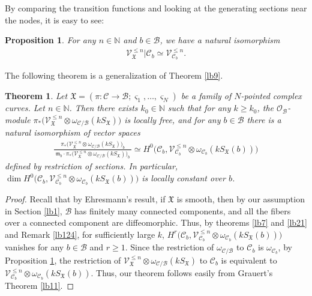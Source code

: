 \documentclass[12pt,a4paper,notitlepage]{report}
\theoremstyle{definition}
\theoremstyle{plain}
\newtheorem{thm}[df]{Theorem}
\newtheorem{pp}[df]{Proposition}
\newcommand{\fk}{\mathfrak}
\newcommand{\mc}{\mathcal}
\newcommand{\scr}{\mathscr}
\newcommand{\sgm}{\varsigma}
\newcommand{\SX}{S_{\fk X}}
\newcommand{\mbb}{\mathbb}
\newcommand{\Nbb}{\mathbb N}
\numberwithin{equation}{section}
\begin{document}
By comparing the transition functions and looking at the generating sections near the nodes, it is easy to see:
\begin{pp}\label{lb26}
For any $n\in\Nbb$ and $b\in\mc B$, we have a natural isomorphism
\begin{align}
\scr V_{\fk X}^{\leq n}|\mc C_b\simeq\scr V_{\mc C_b}^{\leq n}.
\end{align}
\end{pp}

The following theorem is a generalization of Theorem \ref{lb9}. 

\begin{thm}\label{lb27}
Let $\fk X=(\pi:\mc C\rightarrow\mc B;\sgm_1,\dots,\sgm_N)$ be a family of $N$-pointed complex curves.  Let $n\in\Nbb$. Then  there exists $k_0\in\mbb N$ such that for any $k\geq k_0$, the $\scr O_{\mc B}$-module  $\pi_*\big(\scr V_{\fk X}^{\leq n}\otimes\omega_{\mc C/\mc B}(k\SX)\big)$ is locally free, and for any $b\in\mc B$ there is a natural isomorphism of vector spaces
\begin{align}
\frac{\pi_*\big(\scr V_{\fk X}^{\leq n}\otimes\omega_{\mc C/\mc B}(k\SX)\big)_b}{~\fk m_b\cdot\pi_*\big(\scr V_{\fk X}^{\leq n}\otimes\omega_{\mc C/\mc B}(k\SX)\big)_b~}\simeq H^0\big(\mc C_b,\scr V_{\mc C_b}^{\leq n}\otimes\omega_{\mc C_b}(k\SX(b))\big)
\end{align} 
defined by  restriction of sections. In particular,  $\dim  H^0\big(\mc C_b,\scr V_{\mc C_b}^{\leq n}\otimes\omega_{\mc C_b}(k\SX(b))\big)$ is locally constant over $b$.
\end{thm}

\begin{proof}
Recall that by Ehresmann's result, if $\fk X$ is smooth, then by our assumption in Section \ref{lb1}, $\mc B$  has finitely many connected components, and all the fibers over a connected component  are diffeomorphic.  Thus, by theorems \ref{lb7} and \ref{lb21} and Remark \ref{lb124}, for sufficiently large $k$, $H^r\big(\mc C_b,\scr V_{\mc C_b}^{\leq n}\otimes\omega_{\mc C_b}(k\SX(b))\big)$ vanishes for any $b\in\mc B$ and $r\geq 1$. Since the restriction of $\omega_{\mc C/\mc B}$ to $\mc C_b$ is $\omega_{\mc C_b}$, by Proposition \ref{lb26}, the restriction of $\scr V_{\fk X}^{\leq n}\otimes\omega_{\mc C/\mc B}(k\SX)$ to $\mc C_b$ is equivalent to $\scr V_{\mc C_b}^{\leq n}\otimes\omega_{\mc C_b}(k\SX(b))$.  Thus, our theorem follows easily from Grauert's Theorem \ref{lb11}.
\end{proof}
\end{document}
